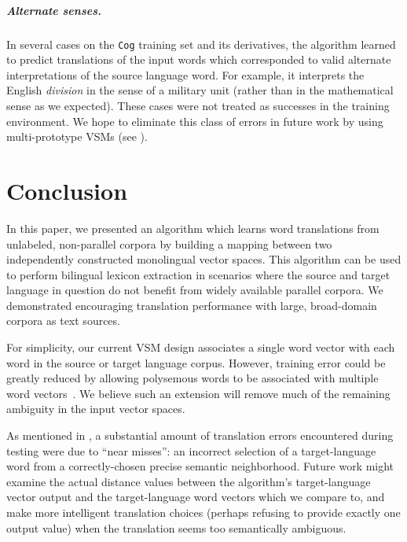 \documentclass[11pt]{article}
\begin{document}
\subparagraph{Alternate senses.} In several cases on the \texttt{Cog} training
set and its derivatives, the algorithm learned to predict translations of the
input words which corresponded to valid alternate interpretations of the source
language word. For example, it interprets the English \textit{division} in the
sense of a military unit (rather than in the mathematical sense as we expected).
These cases were not treated as successes in the  training
environment. We hope to eliminate this class of errors in future work by using
multi-prototype VSMs (see ).


\section{Conclusion}
\label{sec:conclusion}

In this paper, we presented an algorithm which learns word translations from
unlabeled, non-parallel corpora by building a mapping between two independently
constructed monolingual vector spaces. This algorithm can be used to perform
bilingual lexicon extraction in scenarios where the source and target language
in question do not benefit from widely available parallel corpora. We
demonstrated encouraging translation performance with large, broad-domain
corpora as text sources.

For simplicity, our current VSM design associates a single word vector with each
word in the source or target language corpus. However, training error could be
greatly reduced by allowing polysemous words to be associated with multiple word
vectors~\cite{reisinger2010,huang2012}. We believe such an extension will remove
much of the remaining ambiguity in the input vector spaces.

As mentioned in , a substantial amount of
translation errors encountered during testing were due to ``near misses'': an
incorrect selection of a target-language word from a correctly-chosen precise
semantic neighborhood. Future work might examine the actual distance values
between the algorithm's target-language vector output and the target-language
word vectors which we compare to, and make more intelligent translation choices
(perhaps refusing to provide exactly one output value) when the translation
seems too semantically ambiguous. %
\end{document}
